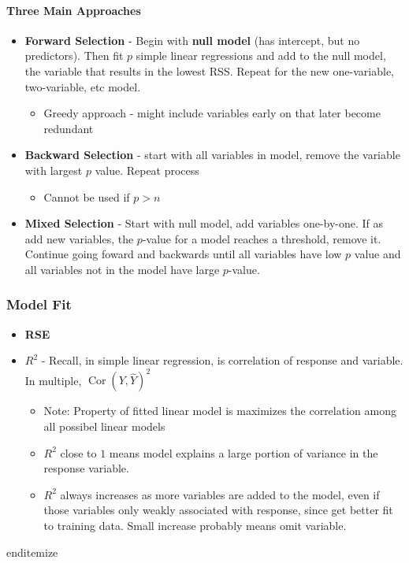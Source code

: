          \paragraph{Three Main Approaches}
         \begin{itemize}
         	\item \textbf{Forward Selection} - Begin with \textbf{null model} (has intercept, but no predictors).  Then fit $p$ simple linear regressions and add to the null model, the variable that results in the lowest RSS.  Repeat for the new one-variable, two-variable, etc model.
         	\begin{itemize}
         		\item Greedy approach - might include variables early on that later become redundant
         	\end{itemize}
         	\item \textbf{Backward Selection} - start with all variables in model, remove the variable with largest $p$ value.  Repeat process
         	\begin{itemize}
         		\item Cannot be used if $p > n$
         	\end{itemize}
         	\item \textbf{Mixed Selection} - Start with  null model, add variables one-by-one.  If as add new variables, the $p$-value for a model reaches a threshold, remove it.  Continue going foward and backwards until all variables have low $p$ value and all variables not in the model have large $p$-value.         \end{itemize}

         \subsubsection*{Model Fit}
         \begin{itemize}
         	\item \textbf{RSE}
         	\item $R^2$ - Recall, in simple linear regression, is correlation of response and variable.  In multiple, $\operatorname{Cor}(Y, \hat Y)^2$
         	\begin{itemize}
         		\item Note: Property of fitted linear model is maximizes the correlation among all possibel linear models
         		\item $R^2$ close to $1$ means model explains a large portion of variance in the response variable.
         		\item $R^2$ always increases as more variables are added to the model, even if those variables only weakly associated with response, since get better fit to training data.  Small increase probably means omit variable.
         	\end{itemize}
         	
         \end{itemize}
         end{itemize}
